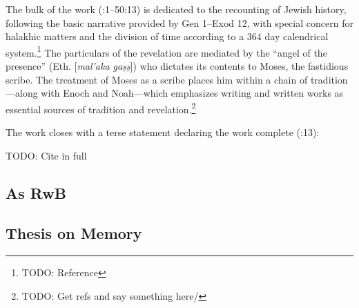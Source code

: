 The bulk of the work (:1--50:13) is dedicated to the recounting of Jewish history, following the basic narrative provided by Gen 1--Exod 12, with special concern for halakhic matters and the division of time according to a 364 day calendrical system.\footnote{TODO: Reference} The particulars of the revelation are mediated by the ``angel of the presence'' (Eth.  [\emph{mal'aka gaṣṣ}]) who dictates its contents to Moses, the fastidious scribe. The treatment of Moses as a scribe places him within a chain of tradition---along with Enoch and Noah---which emphasizes writing and written works as essential sources of tradition and revelation.\footnote{TODO: Get refs and say something here/}

The work closes with a terse statement declaring the work complete (:13):

    TODO: Cite in full

    

\subsection{As RwB}


\subsection{Thesis on Memory}
